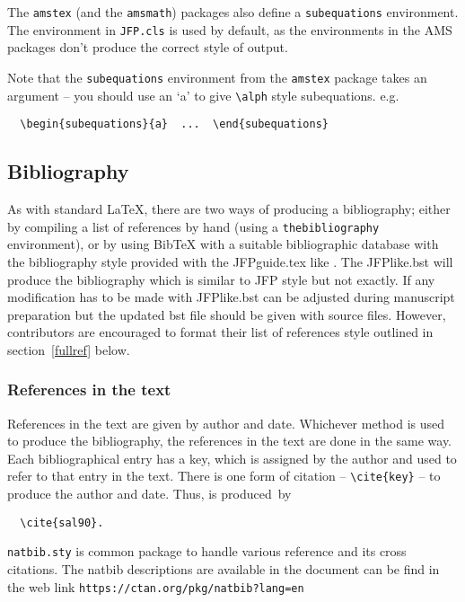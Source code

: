 \documentclass{jfp}
\begin{document}
The \verb"amstex" (and the \verb"amsmath") packages also define a
\verb"subequations" environment.  The environment in \verb"JFP.cls" is used
by default, as the environments in the AMS packages don't produce the correct
style of output.

Note that the \verb"subequations" environment from the \verb"amstex" package
takes an argument -- you should use an `a' to give \verb"\alph" style
subequations. e.g.
\begin{verbatim}
  \begin{subequations}{a}  ...  \end{subequations}
\end{verbatim}

\subsection{Bibliography}

As with standard LaTeX, there are two ways of producing a bibliography;
either by compiling a list of references by hand (using a
\verb"thebibliography" environment), or by using BibTeX with a suitable
bibliographic database with the bibliography style provided with the JFPguide.tex like \verb"". The JFPlike.bst will produce the bibliography which is similar to JFP style but not exactly. If any modification has to be made with JFPlike.bst can be adjusted during manuscript preparation but the updated bst file should be given with source files. However, contributors are encouraged to format
their list of references style outlined in section~\ref{fullref}
below.

\subsubsection{References in the text}

References in the text are given by author and date.
Whichever method is used to produce the bibliography, the references in
the text are done in the same way. Each bibliographical entry has a key,
which is assigned by the author and used to refer to that entry in the
text. There is one form of citation -- \verb"\cite{key}" -- to produce the
author and date. Thus, \cite{sal90} is produced~by
\begin{verbatim}
  \cite{sal90}.
\end{verbatim}

\verb"natbib.sty" is common package to handle various reference and its cross citations. The natbib descriptions are available in the document can be find in the web link \verb"https://ctan.org/pkg/natbib?lang=en"
\end{document}
